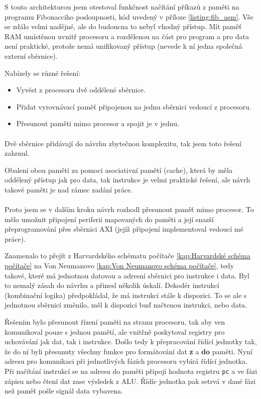 \documentclass[FM,BP]{tulthesis}
\begin{document}
S touto architekturou jsem otestoval funkčnost načítání příkazů z paměti na programu Fibonacciho posloupnosti, kód uvedený v příloze \ref{listing:fib_asm}. Vše se zdálo velmi nadějné, ale do budoucna to nebyl vhodný přístup. Mít paměť RAM umístěnou uvnitř procesoru a rozdělenou na část pro program a pro data není praktické, protože nemá unifikovaný přístup (nevede k ní jedna společná externí sběrnice). 

Nabízely se různé řešení:
\begin{itemize}
    \item Vyvést z procesoru dvě oddělené sběrnice. 
    \item Přidat vyrovnávací paměť připojenou na jednu sběrnici vedoucí z procesoru.
    \item Přesunout paměti mimo procesor a spojit je v jednu.
\end{itemize}

\paragraph{}
Dvě sběrnice přidávají do návrhu zbytečnou komplexitu, tak jsem toto řešení zahrnul. 

Obalení obou pamětí za pomoci asociativní pamětí (cache), která by měla oddělený přístup jak pro data, tak instrukce je velmi praktické řešení, ale návrh takové paměti je nad rámec zadání práce. 

\paragraph{}
Proto jsem se v dalším kroku návrh rozhodl přesunout paměť mimo procesor. To mělo umožnit připojení periferii mapovaných do paměti a její snazší přeprogramování přes sběrnici AXI (jejíž připojení implementoval vedoucí mé práce). 

Znamenalo to přejít z Harvardského schématu počítače \ref{kap:Harvardské schéma počítače} na Von Neumanovo \ref{kap:Von Neumanovo schéma počítače}, tedy takové, které má jednotnou datovou a adresní sběrnici pro instrukce i data. Byl to nemalý zásah do návrhu a přinesl několik úskalí. Dekodér instrukcí (kombinační logika) předpokládal, že má instrukci stále k dispozici. To se ale s jednotnou sběrnicí změnilo, měl k dispozici buď načtenou instrukci, nebo data. 

Řešením bylo přesunout řízení paměti na stranu procesoru, tak aby ven komunikoval pouze s jednou pamětí, ale vnitřně poskytoval registry pro uchovávání jak dat, tak i instrukce. 
Došlo tedy k přepracování řídící jednotky tak, že do ní byli přesunuty všechny funkce pro formátování dat \textbf{z} a \textbf{do} paměti. Nyní adresu pro komunikaci při jednotlivých fázích procesoru vybírá řídící jednotka. 
Při načítání instrukcí se na adresu do paměti připojí hodnota registru \verb|pc| a ve fázi zápisu nebo čtení dat zase výsledek z ALU. 
Řídíc jednotka pak setrvá v dané fázi než paměť pošle signál data vybavena. 
\end{document}
